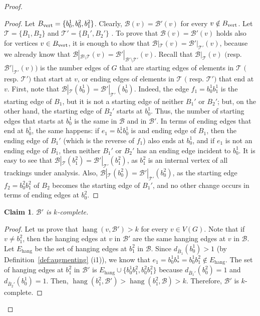 \documentclass[12pt,reqno,a4paper]{amsart}
\newtheorem{claim}[theorem]{Claim}
\DeclareMathOperator{\hang}{hang}
\newcommand{\B}{\mathcal{B}}
\def\vertices{\mathop{\text{\rm vert}}\nolimits}
\begin{document}
\begin{proof}
\begin{proof}
Let $B_{\vertices}=\{b_0^1,b_0^2,b_1^2\}$. Clearly, 
$\B(v)=\B'(v)$ for every $v\notin 
B_{\vertices}$. Let $\mathcal{T}=\{B_1,B_2\}$ and
$\mathcal{T'}=\{B_1',B_2'\}$ .
To prove that  $\B(v)=\B'(v)$ 
holds also for vertices $v\in B_{\vertices}$, it is enough to show that 
$\B|_{\mathcal{T}}(v)=\B'|_{\mathcal{T'}}(v)$, because we already know that 
$\B|_{\B\setminus\mathcal{T}}(v)=\B'|_{\B'\setminus\mathcal{T'}}(v)$. 
Recall that $\B|_{\mathcal{T}}(v)$
$\big($resp. $\B'|_{\mathcal{T'}}(v) \big)$ is the number 
edges of \(G\) that are starting edges of elements in \(\mathcal{T}\) $\big($resp. \(\mathcal{T'}\)$\big)$ that 
start at \(v\), or ending edges of elements in \(\mathcal{T}\) $\big($
resp. \(\mathcal{T'}\)$\big)$ that end at 
\(v\).  First, note that
$\B|_{\mathcal{T}}(b_0^1)=\B'|_{\mathcal{T'}}(b_0^1)$.  Indeed, the
edge $f_1=b_0^1b_1^1$ is the starting edge of $B_1$, but it is not a
starting edge of neither $B_1'$ or $B_2'$; but, on the other hand, the
starting edge of $B_2'$ starts at $b_0^1$. Thus, the number of
starting edges that starts at $b_0^1$ is the same in $\B$ and in
$\B'$. In terms of ending edges that end at $b_0^1$, the same happens:
if $e_1=b_*^1b_0^1$ is and ending edge of $B_1$, then the
ending edge of $B_1'$ (which is the reverse of $f_1$) also ends at
$b_0^1$, and if  $e_1$ is not an ending edge of $B_1$, then neither $B_1'$ or $B_2'$ has an ending edge incident to $b_0^1$. 
It is easy to see that
$\B|_{\mathcal{T}}(b_1^2)=\B'|_{\mathcal{T'}}(b_1^2)$, as $b_1^2$ is
an internal vertex of all trackings under analysis. Also,
$\B|_{\mathcal{T}}(b_0^2)=\B'|_{\mathcal{T'}}(b_0^2)$, as  the
starting edge $f_2= b_0^2b_1^2$ of $B_2$ becomes the starting edge of
$B_1'$, and no other change occurs in terms of ending edges at
$b_0^2$.
\end{proof}

	
\begin{claim}
	\(\B'\) is \(k\)-complete.
\end{claim}
 
\begin{proof}
Let us prove that \(\hang(v,\B')>k\) for every $v\in V(G)$.
Note that if \(v\neq b_1^2\), then the hanging edges at \(v\)
in \(\B'\) are the same hanging edges at \(v\) in \(\B\).
Let \(E_{\hang}\) be the set of hanging edges at \(b_1^2\) in \(\B\).
 Since $d_{\bar B_1}(b_0^1) > 1$ (by Definition~\ref{def:augmenting} (i1)), we know that 
\(e_1=b_0^1b_{*}^1=b_0^1b_1^2 \notin E_{\hang}\).
The set of hanging edges at \(b_1^2\) in \(\B'\) is \(E_{\hang}\cup 
\{b_0^1b_1^2, b_0^2b_1^2\}\) because 
\(d_{\bar B_1'}(b_0^2) = 1\) and \(d_{\bar B_2'}(b_0^1) = 1\).
Then, \(\hang(b_1^2,\B') >  \hang(b_1^2,\B)  > k \).
Therefore, \(\B'\) is \(k\)-complete.
\end{proof}


\end{proof}
\end{document}
